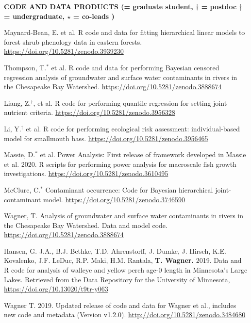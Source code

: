 \documentclass[10pt]{article}
\begin{document}
\begin{flushleft}

\centerline {\bf{CODE AND DATA PRODUCTS ({\small * = graduate student, $\dagger$ = postdoc $\ddagger$ = undergraduate, $\star$ = co-leads })}}
\vspace{5pt}
\begin{etaremune}
	\item Maynard-Bean, E. et al. R code and data for fitting hierarchical linear models to forest shrub phenology data in eastern forests. \url{https://doi.org/10.5281/zenodo.3939230}
	\item Thompson, T.$^*$ et al. R code and data for performing Bayesian censored regression analysis of groundwater and surface water contaminants in rivers in the Chesapeake Bay Watershed. \url{https://doi.org/10.5281/zenodo.3888674}
	\item Liang, Z.$^\dagger$, et al. R code for performing quantile regression for setting joint nutrient criteria. \url{https://doi.org/10.5281/zenodo.3956328}
	\item Li, Y.$^\dagger$ et al. R code for performing ecological risk assessment: individual-based model for smallmouth bass. \url{https://doi.org/10.5281/zenodo.3956465}
	\item Massie, D.$^*$ et al. Power Analysis: First release of framework developed in Massie et al. 2020. R scripts for performing power analysis for macroscale fish growth investigations. \url{https://doi.org/10.5281/zenodo.3610495}
	\item McClure, C.$^*$ Contaminant occurrence: Code for Bayesian hierarchical joint-contaminant model. \url{https://doi.org/10.5281/zenodo.3746590}
	\item Wagner, T. Analysis of groundwater and surface water contaminants in rivers in the Chesapeake Bay Watershed. Data and model code. \url{https://doi.org/10.5281/zenodo.3888674}
	\item Hansen, G. J.A., B.J. Bethke, T.D. Ahrenstorff,  J. Dumke, J.  Hirsch,  K.E. Kovalenko,  J.F. LeDuc, R.P.  Maki,  H.M. Rantala, \textbf{T. Wagner.} 2019. Data and R code for analysis of walleye and yellow perch age-0 length in Minnesota's Large Lakes. Retrieved from the Data Repository for the University of Minnesota, \url{https://doi.org/10.13020/t9tr-y063}
\item Wagner T. 2019. Updated release of code and data for Wagner et al., includes new code and metadata (Version v1.2.0). \url{http://doi.org/10.5281/zenodo.3484680}
	

\end{etaremune}
\end{flushleft}
\end{document}
